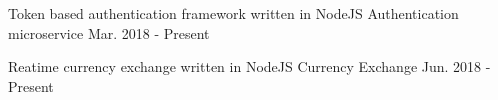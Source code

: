 

\begin{cventries}

  \cventry
    {Token based authentication framework written in NodeJS} %
    {Authentication microservice} %
    {} %
    {Mar. 2018 - Present} %
    {
    }

  \cventry
    {Reatime currency exchange written in NodeJS} %
    {Currency Exchange} %
    {} %
    {Jun. 2018 - Present} %
    {
    }

\end{cventries}
